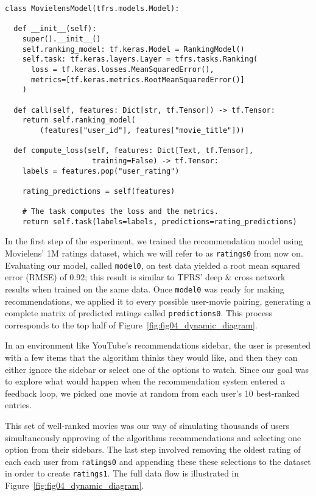 \begin{verbatim}
class MovielensModel(tfrs.models.Model):

  def __init__(self):
    super().__init__()
    self.ranking_model: tf.keras.Model = RankingModel()
    self.task: tf.keras.layers.Layer = tfrs.tasks.Ranking(
      loss = tf.keras.losses.MeanSquaredError(),
      metrics=[tf.keras.metrics.RootMeanSquaredError()]
    )

  def call(self, features: Dict[str, tf.Tensor]) -> tf.Tensor:
    return self.ranking_model(
        (features["user_id"], features["movie_title"]))

  def compute_loss(self, features: Dict[Text, tf.Tensor],
                    training=False) -> tf.Tensor:
    labels = features.pop("user_rating")

    rating_predictions = self(features)

    # The task computes the loss and the metrics.
    return self.task(labels=labels, predictions=rating_predictions)
\end{verbatim}

In the first step of the experiment, we trained the recommendation model using
Movielens' 1M ratings dataset, which we will refer to as \verb|ratings0| from
now on. Evaluating our model, called \verb|model0|, on test data yielded a root
mean squared error (RMSE) of 0.92; this result is similar to TFRS' deep \& cross
network \citep{} results when trained on the same data. Once \verb|model0| was
ready for making recommendations, we applied it to every possible user-movie
pairing, generating a complete matrix of predicted ratings called
\verb|predictions0|. This process corresponds to the top half of
Figure~\ref{fig:fig04_dynamic_diagram}.

In an environment like YouTube's recommendations sidebar, the user is presented
with a few items that the algorithm thinks they would like, and then they can
either ignore the sidebar or select one of the options to watch. Since our goal
was to explore what would happen when the recommendation system entered a
feedback loop, we picked one movie at random from each user's 10 best-ranked
entries.

This set of well-ranked movies was our way of simulating thousands of users
simultaneously approving of the algorithms recommendations and selecting one
option from their sidebars. The last step involved removing the oldest rating of
each each user from \verb|ratings0| and appending these these selections to the
dataset in order to create \verb|ratings1|. The full data flow is illustrated
in Figure~\ref{fig:fig04_dynamic_diagram}.

